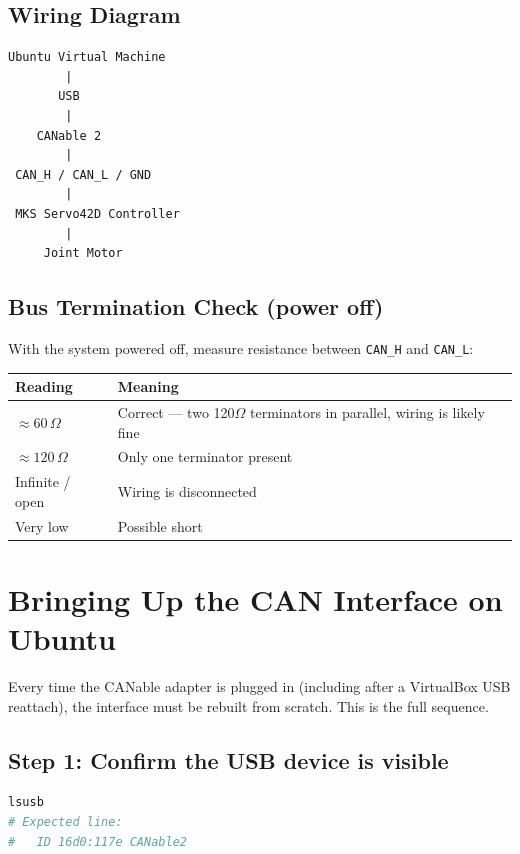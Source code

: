 \documentclass[11pt,letterpaper]{article}
\begin{document}
\subsection{Wiring Diagram}

\begin{lstlisting}[caption=Physical signal path]
Ubuntu Virtual Machine
        |
       USB
        |
    CANable 2
        |
 CAN_H / CAN_L / GND
        |
 MKS Servo42D Controller
        |
     Joint Motor
\end{lstlisting}

\subsection{Bus Termination Check (power off)}
With the system powered off, measure resistance between \texttt{CAN\_H} and \texttt{CAN\_L}:

\begin{table}[h]
\centering
\begin{tabular}{ll}
\toprule
\textbf{Reading} & \textbf{Meaning} \\ \midrule
$\approx 60\,\Omega$ & Correct --- two 120$\Omega$ terminators in parallel, wiring is likely fine \\
$\approx 120\,\Omega$ & Only one terminator present \\
Infinite / open & Wiring is disconnected \\
Very low & Possible short \\ \bottomrule
\end{tabular}
\end{table}

\newpage
\section{Bringing Up the CAN Interface on Ubuntu}
\label{sec:can-bringup}

Every time the CANable adapter is plugged in (including after a VirtualBox USB reattach), the interface must be rebuilt from scratch. This is the full sequence.

\subsection{Step 1: Confirm the USB device is visible}
\begin{lstlisting}[language=bash]
lsusb
# Expected line:
#   ID 16d0:117e CANable2
\end{lstlisting}
\end{document}
